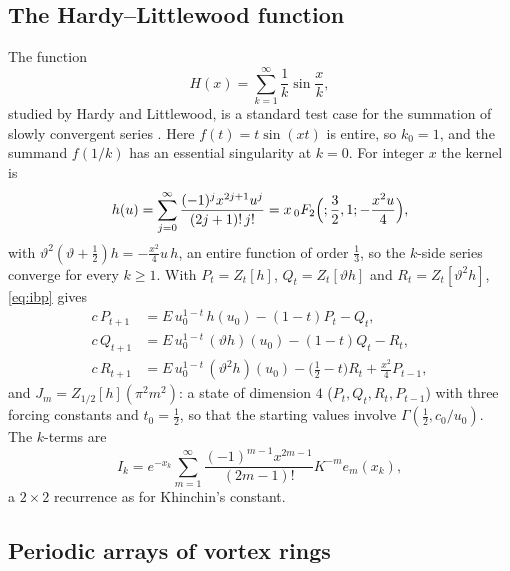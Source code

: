 \documentclass[11pt]{amsart}
\theoremstyle{definition}
\theoremstyle{remark}
\begin{document}
\subsection{The Hardy--Littlewood function}\label{sec:HL}
The function
\[
  H(x) = \sum_{k=1}^{\infty}\frac1k\sin\frac xk,
\]
studied by Hardy and Littlewood, is a standard test case for the summation of slowly convergent series
\cite{Gau05,Mon10}. Here $f(t) = t\sin(xt)$ is entire, so $k_0 = 1$, and the
summand $f(1/k)$ has an essential singularity at $k = 0$. For integer $x$ the kernel is
\[
  h(u) = \sum_{j=0}^{\infty}\frac{(-1)^jx^{2j+1}u^j}{(2j+1)!\,j!} = x\,{}_0F_2\Bigl(;\frac32,1;-\frac{x^2u}4\Bigr),
\]
with $\vartheta^2(\vartheta+\frac12)h = -\frac{x^2}{4}u\,h$,
an entire function of order $\frac13$, so the $k$-side series converge for every $k \ge 1$. With
$P_t = Z_t[h]$, $Q_t = Z_t[\vartheta h]$ and $R_t = Z_t[\vartheta^2h]$, \eqref{eq:ibp} gives
\begin{align*}
  c\,P_{t+1} &= E\,u_0^{1-t}\,h(u_0) - (1-t)P_t - Q_t, \\
  c\,Q_{t+1} &= E\,u_0^{1-t}\,(\vartheta h)(u_0) - (1-t)Q_t - R_t, \\
  c\,R_{t+1} &= E\,u_0^{1-t}\,(\vartheta^2h)(u_0) - \bigl(\tfrac12 - t\bigr)R_t + \tfrac{x^2}{4}P_{t-1},
\end{align*}
and $J_m = Z_{1/2}[h](\pi^2m^2)$: a state of dimension $4$ ($P_t, Q_t, R_t, P_{t-1}$) with three forcing constants and
$t_0 = \frac12$, so that the starting values involve $\Gamma(\frac12, c_0/u_0)$. The $k$-terms are
\[
  I_k = e^{-x_k}\sum_{m=1}^{\infty}\frac{(-1)^{m-1}x^{2m-1}}{(2m-1)!}K^{-m}e_m(x_k),
\]
a $2\times2$ recurrence as for Khinchin's constant.

\subsection{Periodic arrays of vortex rings}\label{sec:vortex}
\end{document}
